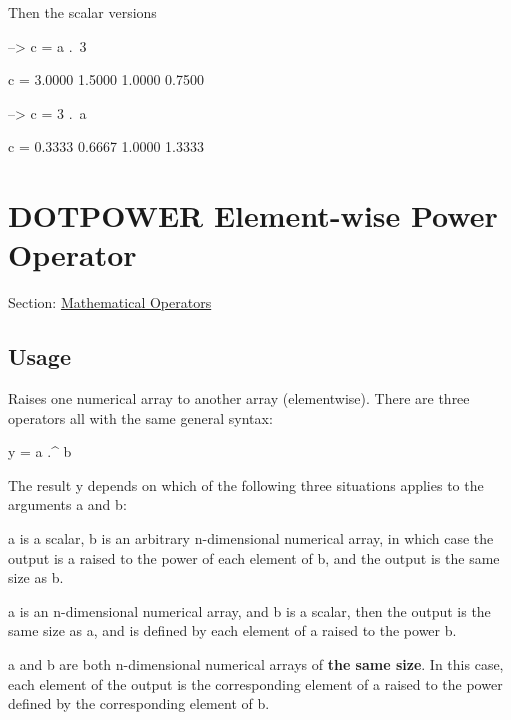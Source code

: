 Then the scalar versions


\begin{DoxyVerbInclude}
--> c = a .\ 3

c = 
    3.0000    1.5000 
    1.0000    0.7500 

--> c = 3 .\ a

c = 
    0.3333    0.6667 
    1.0000    1.3333 
\end{DoxyVerbInclude}
 \hypertarget{operators_dotpower}{}\section{D\-O\-T\-P\-O\-W\-E\-R Element-\/wise Power Operator}\label{operators_dotpower}
Section\-: \hyperlink{sec_operators}{Mathematical Operators} \hypertarget{vtkwidgets_vtkxyplotwidget_Usage}{}\subsection{Usage}\label{vtkwidgets_vtkxyplotwidget_Usage}
Raises one numerical array to another array (elementwise). There are three operators all with the same general syntax\-: \begin{DoxyVerb}  y = a .^ b
\end{DoxyVerb}
 The result {\ttfamily y} depends on which of the following three situations applies to the arguments {\ttfamily a} and {\ttfamily b}\-: 
\begin{DoxyEnumerate}
\item {\ttfamily a} is a scalar, {\ttfamily b} is an arbitrary {\ttfamily n}-\/dimensional numerical array, in which case the output is {\ttfamily a} raised to the power of each element of {\ttfamily b}, and the output is the same size as {\ttfamily b}.  
\item {\ttfamily a} is an {\ttfamily n}-\/dimensional numerical array, and {\ttfamily b} is a scalar, then the output is the same size as {\ttfamily a}, and is defined by each element of {\ttfamily a} raised to the power {\ttfamily b}.  
\item {\ttfamily a} and {\ttfamily b} are both {\ttfamily n}-\/dimensional numerical arrays of {\bfseries the same size}. In this case, each element of the output is the corresponding element of {\ttfamily a} raised to the power defined by the corresponding element of {\ttfamily b}.  
\end{DoxyEnumerate}


